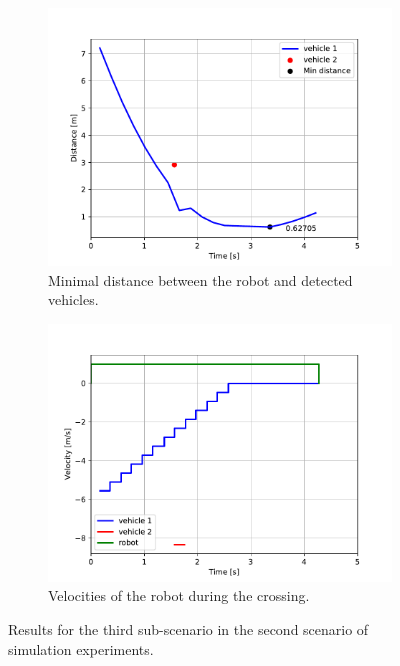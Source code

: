             \begin{figure}[H]
                \centering
                \begin{subfigure}{0.49\linewidth}
                    \centering
                    \includegraphics[trim={24 8 40 41}, clip, width=\linewidth]{images/simulations/scene2_3_dist.pdf}
                    \caption{Minimal distance between the robot and detected vehicles.}
                \end{subfigure}
                \begin{subfigure}{0.49\linewidth}
                    \centering
                    \includegraphics[trim={21 8 40 41}, clip, width=\linewidth]{images/simulations/scene2_3_vel.pdf}
                    \caption{Velocities of the robot during the crossing.}
                \end{subfigure}
                \caption{Results for the third sub-scenario in the second scenario of simulation experiments.}
                \label{fig:scene2_3_graphs}
            \end{figure}
